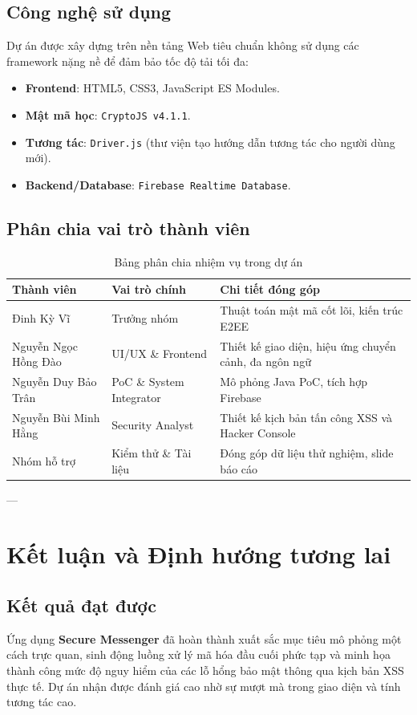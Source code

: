 \documentclass[12pt,a4paper]{article}
\begin{document}
\subsection{Công nghệ sử dụng}
Dự án được xây dựng trên nền tảng Web tiêu chuẩn không sử dụng các framework nặng nề để đảm bảo tốc độ tải tối đa:
\begin{itemize}
    \item \textbf{Frontend}: HTML5, CSS3, JavaScript ES Modules.
    \item \textbf{Mật mã học}: \texttt{CryptoJS v4.1.1}.
    \item \textbf{Tương tác}: \texttt{Driver.js} (thư viện tạo hướng dẫn tương tác cho người dùng mới).
    \item \textbf{Backend/Database}: \texttt{Firebase Realtime Database}.
\end{itemize}

\subsection{Phân chia vai trò thành viên}
\begin{table}[h]
\centering
\caption{Bảng phân chia nhiệm vụ trong dự án}
\begin{tabular}{llp{6.5cm}}
\toprule
\textbf{Thành viên} & \textbf{Vai trò chính} & \textbf{Chi tiết đóng góp} \\
\midrule
Đinh Kỳ Vĩ & Trưởng nhóm & Thuật toán mật mã cốt lõi, kiến trúc E2EE \\
Nguyễn Ngọc Hồng Đào & UI/UX \& Frontend & Thiết kế giao diện, hiệu ứng chuyển cảnh, đa ngôn ngữ \\
Nguyễn Duy Bảo Trân & PoC \& System Integrator & Mô phỏng Java PoC, tích hợp Firebase \\
Nguyễn Bùi Minh Hằng & Security Analyst & Thiết kế kịch bản tấn công XSS và Hacker Console \\
Nhóm hỗ trợ & Kiểm thử \& Tài liệu & Đóng góp dữ liệu thử nghiệm, slide báo cáo \\
\bottomrule
\end{tabular}
\end{table}

---

\section{Kết luận và Định hướng tương lai}
\subsection{Kết quả đạt được}
Ứng dụng \textbf{Secure Messenger} đã hoàn thành xuất sắc mục tiêu mô phỏng một cách trực quan, sinh động luồng xử lý mã hóa đầu cuối phức tạp và minh họa thành công mức độ nguy hiểm của các lỗ hổng bảo mật thông qua kịch bản XSS thực tế. Dự án nhận được đánh giá cao nhờ sự mượt mà trong giao diện và tính tương tác cao.
\end{document}
